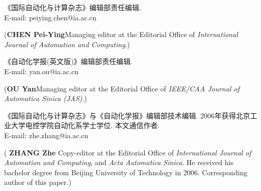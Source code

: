 \documentclass{aas}
\begin{document}
\begin{biographynophoto}
\quad 《国际自动化与计算杂志》编辑部责任编辑.\\E-mail: peiying.chen@ia.ac.cn

\noindent({\bf CHEN Pei-Ying}\quad Managing editor at the Editorial Office of
{\sl International Journal of Automation and Computing}.)
\end{biographynophoto}

\begin{biographynophoto}
\quad 《自动化学报(英文版)》编辑部责任编辑.\\E-mail: yan.ou@ia.ac.cn

\noindent({\bf OU Yan}\quad Managing editor at the Editorial Office of
{\sl IEEE/CAA Journal of Automatica Sinica (JAS)}.)
\end{biographynophoto}

\begin{biography}
\quad
《国际自动化与计算杂志》与《自动化学报》编辑部技术编辑. 2006年获得北京工业大学电控学院自动化系学士学位.
本文通信作者.\\E-mail: zhe.zhang@ia.ac.cn

\noindent({\bf
ZHANG Zhe
}\quad
Copy-editor at the Editorial Office of
{\sl International Journal of Automation and Computing}, and {\sl
Acta Automatica Sinica}. He received his bachelor degree from Beijing
University of Technology in 2006. Corresponding author of this paper.)
\end{biography}
\end{document}
